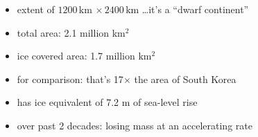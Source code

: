 \documentclass[hide notes,intlimits]{beamer}
\begin{document}
\begin{frame}[plain]
\end{frame}

  {
} 

\begin{frame}[plain]
    \begin{itemize}
    \item extent of $1200\,\text{km}\,\times 2400\,\text{km}$ \dots it's a ``dwarf continent''
    \item total area: 2.1 million km$^2$
    \item ice covered area:  1.7 million km$^2$
    \item \alert{for comparison: that's 17$\times$ the area of South Korea}
    \item has ice equivalent of 7.2 m of sea-level rise
    \item over past 2 decades: losing mass at an accelerating rate
    \end{itemize}
\end{frame}


{
%
} 
\end{document}
